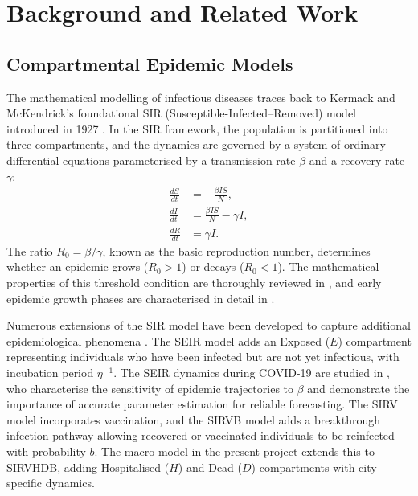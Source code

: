 

\chapter{Background and Related Work}
\label{ch:related}

\section{Compartmental Epidemic Models}
\label{sec:sir}

The mathematical modelling of infectious diseases traces back to Kermack and McKendrick's foundational SIR (Susceptible-Infected--Removed) model introduced in 1927 \citep{kermack1927}.
In the SIR framework, the population is partitioned into three compartments, and the dynamics are governed by a system of ordinary differential equations parameterised by a transmission rate $\beta$ and a recovery rate $\gamma$:
\begin{align}
  \frac{dS}{dt} &= -\frac{\beta I S}{N}, \\
  \frac{dI}{dt} &= \frac{\beta I S}{N} - \gamma I, \\
  \frac{dR}{dt} &= \gamma I.
\end{align}
The ratio $R_0 = \beta/\gamma$, known as the basic reproduction number, determines whether an epidemic grows ($R_0 > 1$) or decays ($R_0 < 1$).
The mathematical properties of this threshold condition are thoroughly reviewed in \citet{hethcote2000}, and early epidemic growth phases are characterised in detail in \citet{chowell2016}.

Numerous extensions of the SIR model have been developed to capture additional epidemiological phenomena \citep{hethcote2000}.
The SEIR model adds an Exposed ($E$) compartment representing individuals who have been infected but are not yet infectious, with incubation period $\eta^{-1}$.
The SEIR dynamics during COVID-19 are studied in \citet{he2020}, who characterise the sensitivity of epidemic trajectories to $\beta$ and demonstrate the importance of accurate parameter estimation for reliable forecasting.
The SIRV model incorporates vaccination, and the SIRVB model \citep{ariyaratne2025} adds a breakthrough infection pathway allowing recovered or vaccinated individuals to be reinfected with probability $b$.
The macro model in the present project extends this to SIRVHDB, adding Hospitalised ($H$) and Dead ($D$) compartments with city-specific dynamics.

